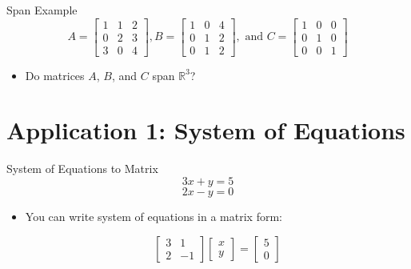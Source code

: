 \documentclass[aspectratio=43]{beamer}
\begin{document}
\begin{frame}{Span Example}
  $$
    A = \begin{bmatrix}
      1 & 1 & 2 \\
      0 & 2 & 3 \\
      3 & 0 & 4
    \end{bmatrix},
    B = \begin{bmatrix}
      1 & 0 & 4 \\
      0 & 1 & 2 \\
      0 & 1 & 2
    \end{bmatrix}, \text{ and }
    C = \begin{bmatrix}
      1 & 0 & 0 \\
      0 & 1 & 0 \\
      0 & 0 & 1
    \end{bmatrix}
  $$
  \begin{itemize}
    \item Do matrices $A$, $B$, and $C$ span $\mathbb{R}^3$?
  \end{itemize}
  \vspace{50mm}
\end{frame}

\section{Application 1: System of Equations}

\begin{frame}{System of Equations to Matrix}
  $$ 3x + y = 5$$ $$2x - y = 0 $$

  \begin{itemize}
    \item You can write system of equations in a matrix form:

          $$
            \begin{bmatrix} 3 & 1 \\ 2 & -1 \end{bmatrix} \begin{bmatrix} x \\ y \end{bmatrix} = \begin{bmatrix} 5 \\ 0 \end{bmatrix}
          $$
  \end{itemize}

  \vspace{30mm}

\end{frame}
\end{document}
